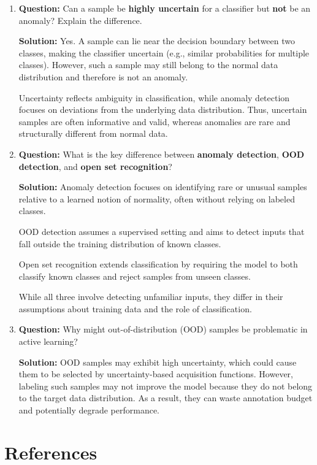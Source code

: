 \documentclass{article}
\begin{document}
\begin{enumerate}
\item \textbf{Question:} 
Can a sample be \textbf{highly uncertain} for a classifier but \textbf{not} be an anomaly? Explain the difference.

\textbf{Solution:}  
Yes. A sample can lie near the decision boundary between two classes, making the classifier uncertain (e.g., similar probabilities for multiple classes). However, such a sample may still belong to the normal data distribution and therefore is not an anomaly.

Uncertainty reflects ambiguity in classification, while anomaly detection focuses on deviations from the underlying data distribution. Thus, uncertain samples are often informative and valid, whereas anomalies are rare and structurally different from normal data.

\item \textbf{Question:} 
What is the key difference between \textbf{anomaly detection}, \textbf{OOD detection}, and \textbf{open set recognition}?

\textbf{Solution:}  
Anomaly detection focuses on identifying rare or unusual samples relative to a learned notion of normality, often without relying on labeled classes.  

OOD detection assumes a supervised setting and aims to detect inputs that fall outside the training distribution of known classes.  

Open set recognition extends classification by requiring the model to both classify known classes and reject samples from unseen classes.  

While all three involve detecting unfamiliar inputs, they differ in their assumptions about training data and the role of classification.

\item \textbf{Question:} 
Why might out-of-distribution (OOD) samples be problematic in active learning?

\textbf{Solution:}  
OOD samples may exhibit high uncertainty, which could cause them to be selected by uncertainty-based acquisition functions. However, labeling such samples may not improve the model because they do not belong to the target data distribution. As a result, they can waste annotation budget and potentially degrade performance.

\end{enumerate}



\section{References}
\end{document}
